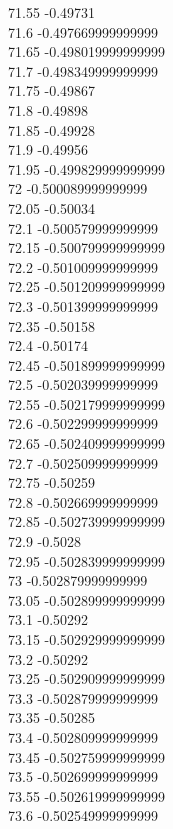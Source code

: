 {71.55	-0.49731\\
71.6	-0.497669999999999\\
71.65	-0.498019999999999\\
71.7	-0.498349999999999\\
71.75	-0.49867\\
71.8	-0.49898\\
71.85	-0.49928\\
71.9	-0.49956\\
71.95	-0.499829999999999\\
72	-0.500089999999999\\
72.05	-0.50034\\
72.1	-0.500579999999999\\
72.15	-0.500799999999999\\
72.2	-0.501009999999999\\
72.25	-0.501209999999999\\
72.3	-0.501399999999999\\
72.35	-0.50158\\
72.4	-0.50174\\
72.45	-0.501899999999999\\
72.5	-0.502039999999999\\
72.55	-0.502179999999999\\
72.6	-0.502299999999999\\
72.65	-0.502409999999999\\
72.7	-0.502509999999999\\
72.75	-0.50259\\
72.8	-0.502669999999999\\
72.85	-0.502739999999999\\
72.9	-0.5028\\
72.95	-0.502839999999999\\
73	-0.502879999999999\\
73.05	-0.502899999999999\\
73.1	-0.50292\\
73.15	-0.502929999999999\\
73.2	-0.50292\\
73.25	-0.502909999999999\\
73.3	-0.502879999999999\\
73.35	-0.50285\\
73.4	-0.502809999999999\\
73.45	-0.502759999999999\\
73.5	-0.502699999999999\\
73.55	-0.502619999999999\\
73.6	-0.502549999999999\\
}
